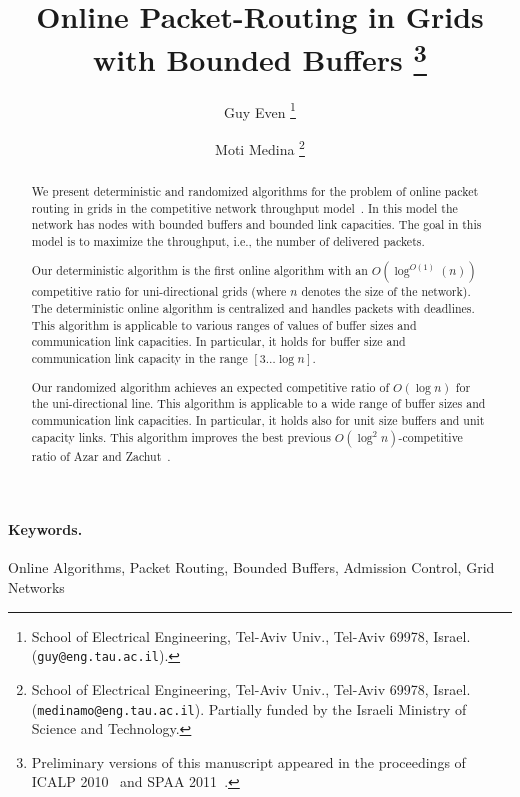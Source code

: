 \documentclass[11pt]{article}
\newenvironment{proof sketch}[1]{\noindent {\emph{Proof sketch of #1:}}}{\hfill \qed}
\begin{document}
 \title{Online Packet-Routing in Grids with Bounded Buffers \thanks{Preliminary
    versions of this manuscript appeared in the proceedings of ICALP
    2010~\cite{DBLP:conf/icalp/EvenM10} and SPAA 2011~\cite{DBLP:conf/spaa/EvenM11}.}
}

\author{Guy Even
\thanks{School of Electrical Engineering, Tel-Aviv Univ., Tel-Aviv 69978, Israel. ({\tt guy@eng.tau.ac.il}).}
\and
Moti Medina
\thanks{School of Electrical Engineering, Tel-Aviv Univ., Tel-Aviv 69978, Israel. ({\tt medinamo@eng.tau.ac.il}).
Partially funded
by the Israeli Ministry of Science and Technology.}}

\maketitle
\begin{abstract}

We present deterministic and randomized algorithms for the problem
  of online packet routing in grids in the competitive network throughput
  model~\cite{AKOR}. In this model the network  has nodes with bounded buffers and bounded
  link capacities. The goal in this model is to maximize the throughput, i.e., the
  number of delivered packets.

  Our deterministic algorithm is the first online
  algorithm with an $O\left(\log^{O(1)}(n)\right)$
  competitive ratio for uni-directional grids (where $n$
  denotes the size of the network).  The deterministic
  online algorithm is centralized and handles packets
  with deadlines.  This algorithm is applicable to
  various ranges of values of buffer sizes and
  communication link capacities. In particular, it holds
  for buffer size and communication link capacity in the
  range $[3 \ldots \log n]$.

Our randomized algorithm achieves an expected competitive ratio of $O(\log n)$ for
the uni-directional line. This algorithm is applicable to a wide range of buffer
  sizes and communication link capacities. In particular, it holds also for unit size
  buffers and unit capacity links.  This algorithm improves the best previous
  $O(\log^2 n)$-competitive ratio of Azar and Zachut~\cite{AZ}.
\end{abstract}

\paragraph{Keywords.}
Online Algorithms, Packet Routing,  Bounded Buffers, Admission Control, Grid Networks
\thispagestyle{empty}
\end{document}
